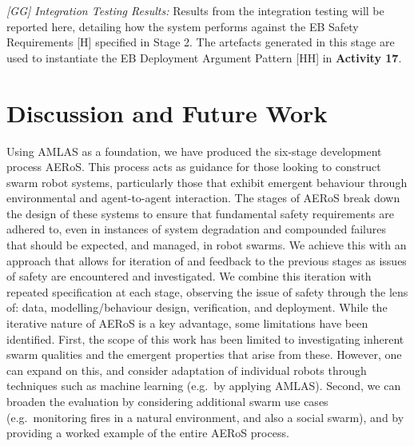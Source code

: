 \documentclass[runningheads]{llncs}
\begin{document}
\emph{[GG] Integration Testing Results:} Results from the integration testing will be reported here, detailing how the system performs against the EB Safety Requirements [H] specified in Stage 2. 
The artefacts generated in this stage are used to instantiate the EB Deployment Argument Pattern [HH] in \textbf{Activity 17}.
\section{Discussion and Future Work} \label{discussion-conclusions}
Using AMLAS \cite{Hawkins2021} as a foundation, we have produced the six-stage development process AERoS. This process acts as guidance for those looking to construct swarm robot systems, particularly those that exhibit emergent behaviour through environmental and agent-to-agent interaction. The stages of AERoS break down the design of these systems to ensure that fundamental safety requirements are adhered to, even in instances of system degradation and compounded failures that should be expected, and managed, in robot swarms. We achieve this with an approach that allows for iteration of and feedback to the previous stages as issues of safety are encountered and investigated. We combine this iteration with repeated specification at each stage, observing the issue of safety through the lens of: data, modelling/behaviour design, verification, and deployment. 
While the iterative nature of AERoS is a key advantage, some limitations have been identified. 
First, the scope of this work has been limited to investigating inherent swarm qualities and the emergent properties that arise from these. 
However, one can expand on this, and consider adaptation of individual robots through techniques such as machine learning (e.g.\ by applying AMLAS).
Second, we can broaden the evaluation by considering additional swarm use cases (e.g.\ monitoring fires in a natural environment, and also a social swarm), and by providing a worked example of the entire AERoS process.
\end{document}
